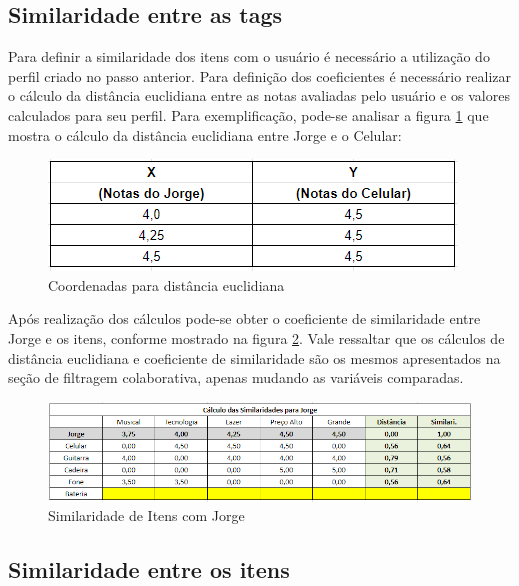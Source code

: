 \subsection{Similaridade entre as tags}

Para definir a similaridade dos itens com o usuário é necessário a utilização do perfil criado no passo anterior. Para definição dos coeficientes é necessário realizar o cálculo da distância euclidiana entre as notas avaliadas pelo usuário e os valores calculados para seu perfil. Para exemplificação, pode-se analisar a figura \ref{fig:coordenadasConteudo} que mostra o cálculo da distância euclidiana entre Jorge e o Celular:

\begin{figure}[H]
	\centering
	\includegraphics[width=.8\linewidth]{imagens/coordenadasConteudo.PNG}
	\caption[Coordenadas para distância euclidiana]{Coordenadas para distância euclidiana}
    \label{fig:coordenadasConteudo}
\end{figure}

Após realização dos cálculos pode-se obter o coeficiente de similaridade entre Jorge e os itens, conforme mostrado na figura \ref{fig:similaridadeConteudo}. Vale ressaltar que os cálculos de distância euclidiana e coeficiente de similaridade são os mesmos apresentados na seção de filtragem colaborativa, apenas mudando as variáveis comparadas. 

\begin{figure}[H]
	\centering
	\includegraphics[width=1\linewidth]{imagens/similaridadeConteudo.PNG}
	\caption[Similaridade de Itens com Jorge]{Similaridade de Itens com Jorge}
    \label{fig:similaridadeConteudo}
\end{figure}

\subsection{Similaridade entre os itens}

